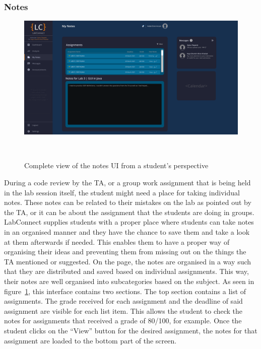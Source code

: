 \documentclass[a4paper, 12pt]{article}
\begin{document}
    \subsubsection{Notes}
    
    \begin{figure}[H]
        \centering
        \includegraphics[width=\textwidth]{student_notes}
        \caption{Complete view of the notes UI from a student's perspective}~\label{fig:student_notes_full}
    \end{figure}

    During a code review by the TA, or a group work assignment that is being held in the lab session itself,
    the student might need a place for taking individual notes. These notes can be related to their
    mistakes on the lab as pointed out by the TA, or it can be about the assignment that the 
    students are doing in groups. LabConnect supplies students with a proper place where students
    can take notes in an organised manner and they have the chance to save them and take a look
    at them afterwards if needed. This enables them to have a proper way of organising their ideas
    and preventing them from missing out on the things the TA mentioned or suggested. On the
    page, the notes are organised in a way such that they are distributed and saved based on individual 
    assignments. This way, their notes are well organised into subcategories
    based on the subject. As seen in figure~\ref{fig:student_notes_full}, this interface contains
    two sections. The top section contains a list of assignments. The grade received for each
    assignment and the deadline of said assignment are visible for each list item. This allows the
    student to check the notes for assignments that received a grade of 80/100, for example. Once
    the student clicks on the ``View'' button for the desired assignment, the notes for that assignment
    are loaded to the bottom part of the screen.
\end{document}
